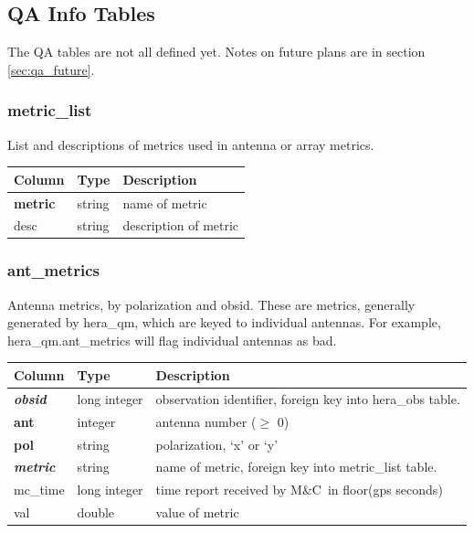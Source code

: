 \documentclass{article}
\newcommand{\mc}{M\&C}
\begin{document}
{%

\subsection{QA Info Tables}
The QA tables are not all defined yet. Notes on future plans are in section \ref{sec:qa_future}.

\subsubsection{metric\_list}
List and descriptions of metrics used in antenna or array metrics.

\begin{center}
 \begin{tabular}{| p{4cm} | p{2cm} | p{10cm} |}
\hline
 {\bf Column} & {\bf Type}  & {\bf Description} \\ [0.5ex]  \hline\hline
\textbf{metric} & string & name of metric \\ \hline
desc & string & description of metric \\ \hline
\end{tabular}
\end{center}

\subsubsection{ant\_metrics}
Antenna metrics, by polarization and obsid. These are metrics, generally generated by
hera\_qm, which are keyed to individual antennas. For example, hera\_qm.ant\_metrics
will flag individual antennas as bad.

\begin{center}
 \begin{tabular}{| p{4cm} | p{2cm} | p{10cm} |}
\hline
 {\bf Column} & {\bf Type}  & {\bf Description} \\ [0.5ex]  \hline\hline
\textbf{\textit{obsid}} & long integer & observation identifier, foreign key into hera\_obs table. \\ \hline
\textbf{ant} & integer & antenna number ($\geq$ 0) \\ \hline
\textbf{pol} & string & polarization, `x' or `y' \\ \hline
\textbf{\textit{metric}} & string & name of metric, foreign key into metric\_list table. \\ \hline
mc\_time & long integer & time report received by \mc\ in floor(gps seconds) \\ \hline
val & double & value of metric \\ \hline
\end{tabular}
\end{center}

}
\end{document}
